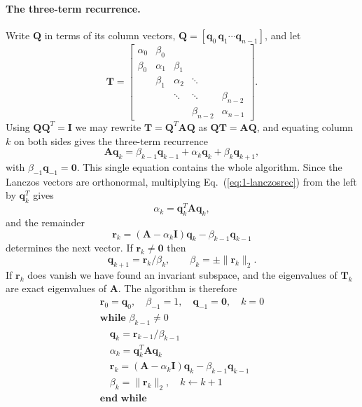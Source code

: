 \paragraph{The three-term recurrence.}
Write $\bm{Q}$ in terms of its column vectors,
$\bm{Q}=[\bm{q}_0\,\bm{q}_1\cdots\bm{q}_{n-1}]$, and let
\begin{equation}
  \bm{T} =
  \begin{bmatrix}
    \alpha_0 & \beta_0  &        &        &  \\
    \beta_0  & \alpha_1 & \beta_1&        &  \\
             & \beta_1  & \alpha_2 & \ddots & \\
             &          & \ddots & \ddots & \beta_{n-2}\\
             &          &        & \beta_{n-2} & \alpha_{n-1}
  \end{bmatrix}.
  \label{eq:1-lanczosT}
\end{equation}
Using $\bm{Q}\bm{Q}^{T}=\bm{I}$ we may rewrite
$\bm{T}=\bm{Q}^{T}\bm{A}\bm{Q}$ as $\bm{Q}\bm{T}=\bm{A}\bm{Q}$, and equating
column $k$ on both sides gives the three-term recurrence
\begin{equation}
  \bm{A}\bm{q}_k = \beta_{k-1}\bm{q}_{k-1}
                 + \alpha_k\bm{q}_k
                 + \beta_k\bm{q}_{k+1},
  \label{eq:1-lanczosrec}
\end{equation}
with $\beta_{-1}\bm{q}_{-1}=\bm{0}$.  This single equation contains the whole
algorithm.  Since the Lanczos vectors are orthonormal, multiplying
Eq.~(\ref{eq:1-lanczosrec}) from the left by $\bm{q}_k^{T}$ gives
\begin{equation}
  \alpha_k = \bm{q}_k^{T}\bm{A}\bm{q}_k ,
  \label{eq:1-lanczosalpha}
\end{equation}
and the remainder
\begin{equation}
  \bm{r}_k = (\bm{A}-\alpha_k\bm{I})\bm{q}_k - \beta_{k-1}\bm{q}_{k-1}
  \label{eq:1-lanczosr}
\end{equation}
determines the next vector.  If $\bm{r}_k\ne\bm{0}$ then
\begin{equation}
  \bm{q}_{k+1} = \bm{r}_k/\beta_k,
  \qquad \beta_k = \pm\|\bm{r}_k\|_2 .
  \label{eq:1-lanczosbeta}
\end{equation}
If $\bm{r}_k$ does vanish we have found an invariant subspace, and the
eigenvalues of $\bm{T}_k$ are exact eigenvalues of $\bm{A}$.  The algorithm is
therefore
\begin{equation}
  \begin{array}{l}
    \bm{r}_0=\bm{q}_0,\quad \beta_{-1}=1,\quad \bm{q}_{-1}=\bm{0},\quad k=0\\
    \textbf{while } \beta_{k-1}\ne 0\\
    \quad \bm{q}_k = \bm{r}_{k-1}/\beta_{k-1}\\
    \quad \alpha_k = \bm{q}_k^{T}\bm{A}\bm{q}_k\\
    \quad \bm{r}_k = (\bm{A}-\alpha_k\bm{I})\bm{q}_k-\beta_{k-1}\bm{q}_{k-1}\\
    \quad \beta_k = \|\bm{r}_k\|_2,\quad k\leftarrow k+1\\
    \textbf{end while}
  \end{array}
  \label{eq:1-lanczosalgo}
\end{equation}

